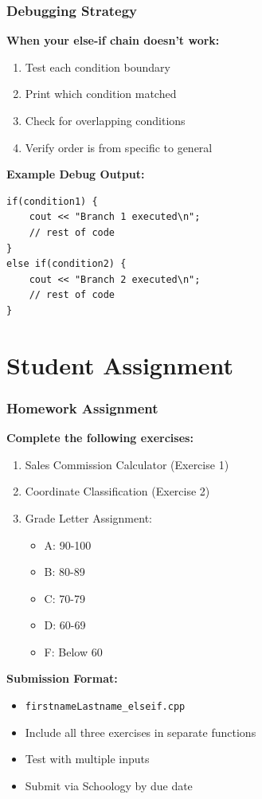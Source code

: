 \documentclass{beamer}
\begin{document}
\begin{frame}[fragile]
\frametitle{Debugging Strategy}
\textbf{When your else-if chain doesn't work:}

\begin{enumerate}
    \item Test each condition boundary
    \item Print which condition matched
    \item Check for overlapping conditions
    \item Verify order is from specific to general
\end{enumerate}\pause

\vspace{0.3cm}
\textbf{Example Debug Output:}
\begin{verbatim}
if(condition1) {
    cout << "Branch 1 executed\n";
    // rest of code
}
else if(condition2) {
    cout << "Branch 2 executed\n";
    // rest of code
}
\end{verbatim}
\end{frame}

\section{Student Assignment}

\begin{frame}
\frametitle{Homework Assignment}
\textbf{Complete the following exercises:}

\begin{enumerate}
    \item Sales Commission Calculator (Exercise 1)
    \item Coordinate Classification (Exercise 2)
    \item Grade Letter Assignment:
    \begin{itemize}
        \item A: 90-100
        \item B: 80-89
        \item C: 70-79
        \item D: 60-69
        \item F: Below 60
    \end{itemize}
\end{enumerate}

\vspace{0.3cm}
\textbf{Submission Format:}
\begin{itemize}
    \item \texttt{firstnameLastname\_elseif.cpp}
    \item Include all three exercises in separate functions
    \item Test with multiple inputs
    \item Submit via Schoology by due date
\end{itemize}
\end{frame}
\end{document}
